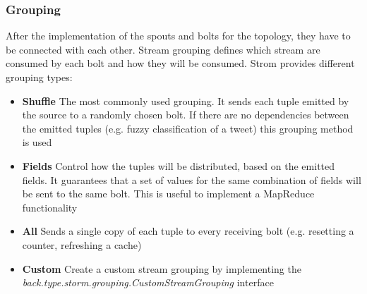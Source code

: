 \documentclass[a4paper]{article}
\begin{document}
\subsubsection{Grouping}
After the implementation of the spouts and bolts for the topology, they have to be connected with each other. Stream grouping defines which stream are consumed by each bolt and how they will be consumed. Strom provides different grouping types: 
\begin{itemize}
	\item \textbf{Shuffle} The most commonly used grouping. It sends each tuple emitted by the source to a randomly chosen bolt. If there are no dependencies between the emitted tuples (e.g. fuzzy classification of a tweet) this grouping method is used 
	\item \textbf{Fields} Control how the tuples will be distributed, based on the emitted fields. It guarantees that a set of values for the same combination of fields will be sent to the same bolt. This is useful to implement a MapReduce functionality 
	\item \textbf{All} Sends a single copy of each tuple to every receiving bolt (e.g. resetting a counter, refreshing a cache) 
	\item \textbf{Custom} Create a custom stream grouping by implementing the\\
\textit{back.type.storm.grouping.CustomStreamGrouping} interface 
\end{itemize}
\end{document}
